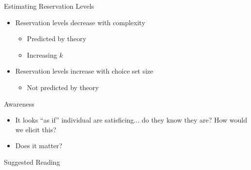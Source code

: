 \begin{frame}{Estimating Reservation Levels}
\begin{itemize}
    \item Reservation levels decrease with complexity
    \begin{itemize}
        \item Predicted by theory
        \item Increasing $k$
    \end{itemize}
    \item Reservation levels increase with choice set size
    \begin{itemize}
        \item Not predicted by theory
    \end{itemize}
\end{itemize}    
\end{frame}

\begin{frame}{Awareness}
\large 
    \begin{itemize}
        \item It looks ``as if'' individual are satisficing... do they know they are? How would we elicit this?
        \item Does it matter?
    \end{itemize}
\end{frame}



\nocite{CaplinEtAl2011}

\begin{frame}[allowframebreaks]{Suggested Reading}
    
\end{frame}



